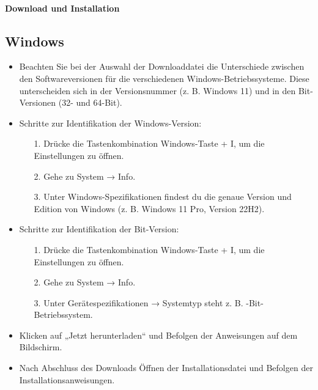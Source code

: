 \paragraph{ Download und Installation}
\subsection*{Windows}
\begin{itemize}
	\item Beachten Sie bei der Auswahl der Downloaddatei die Unterschiede zwischen den Softwareversionen für die verschiedenen Windows-Betriebssysteme. Diese unterscheiden sich in der Versionsnummer (z. B. \glqq Windows 11\grqq {}) und in den Bit-Versionen (32- und 64-Bit).
	\item Schritte zur Identifikation der Windows-Version:
		\begin{itemize}
		\item[1.] Drücke die Tastenkombination Windows-Taste + I, um die Einstellungen zu öffnen.
		\item[2.] Gehe zu System → Info.
		\item[3.] Unter Windows-Spezifikationen findest du die genaue Version und Edition von Windows (z. B. \glqq Windows 11 Pro\grqq {}, \glqq Version 22H2\grqq {}).
		\end{itemize}
	\item Schritte zur Identifikation der Bit-Version:
		\begin{itemize}
		\item[1.] Drücke die Tastenkombination Windows-Taste + I, um die Einstellungen zu öffnen.
		\item[2.] Gehe zu System → Info.
		\item[3.] 	Unter Gerätespezifikationen → Systemtyp steht z. B. -Bit-Betriebssystem\grqq {}.
		\end{itemize}
	\item Klicken auf „Jetzt herunterladen“ und Befolgen der Anweisungen auf dem Bildschirm.
	\item Nach Abschluss des Downloads Öffnen der Installationsdatei und Befolgen der Installationsanweisungen.
\end{itemize}
